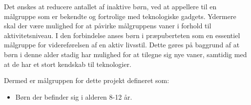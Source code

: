 Det ønskes at reducere antallet af inaktive børn, ved at appellere til en målgruppe som er bekendte og fortrolige med teknologiske gadgets. Ydermere skal der være mulighed for at påvirke målgruppens vaner i forhold til aktivitetsniveau. 
I den forbindelse anses børn i præpuberteten som en essentiel målgruppe for videreførelsen af en aktiv livsstil. Dette gøres på baggrund af at børn i denne alder stadig har mulighed for at tilegne sig nye vaner, samtidig med at de har et stort kendskab til teknologier. 





Dermed er målgruppen for dette projekt defineret som: 

\begin{itemize}
\item Børn der befinder sig i alderen 8-12 år.
\end{itemize}